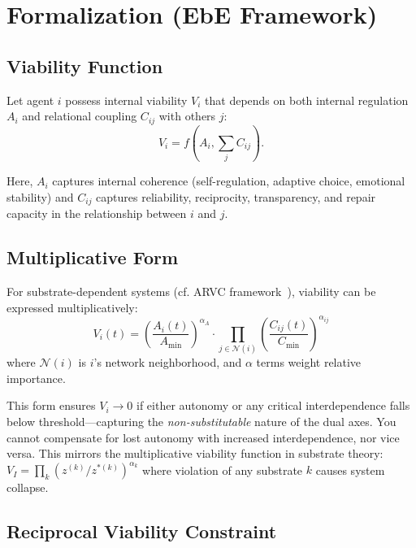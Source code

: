 \documentclass[11pt,a4paper]{article}
\begin{document}
\section{Formalization (EbE Framework)}

\subsection{Viability Function}

Let agent $i$ possess internal viability $V_i$ that depends on both internal regulation $A_i$ and relational coupling $C_{ij}$ with others $j$:
\begin{equation}
  V_i = f\!\left(A_i, \sum_{j} C_{ij}\right).
  \label{eq:viability-basic}
\end{equation}

Here, $A_i$ captures internal coherence (self-regulation, adaptive choice, emotional stability) and $C_{ij}$ captures reliability, reciprocity, transparency, and repair capacity in the relationship between $i$ and $j$.

\subsection{Multiplicative Form}

For substrate-dependent systems (cf. ARVC framework~\cite{arvc}), viability can be expressed multiplicatively:
\begin{equation}
  V_i(t) = \left(\frac{A_i(t)}{A_{\min}}\right)^{\alpha_A} \cdot \prod_{j \in \mathcal{N}(i)} \left(\frac{C_{ij}(t)}{C_{\min}}\right)^{\alpha_{ij}}
  \label{eq:viability-multiplicative}
\end{equation}
where $\mathcal{N}(i)$ is $i$'s network neighborhood, and $\alpha$ terms weight relative importance. 

This form ensures $V_i \to 0$ if either autonomy or any critical interdependence falls below threshold---capturing the \emph{non-substitutable} nature of the dual axes. You cannot compensate for lost autonomy with increased interdependence, nor vice versa. This mirrors the multiplicative viability function in substrate theory: $V_I = \prod_k (z^{(k)}/z^{*(k)})^{\alpha_k}$ where violation of any substrate $k$ causes system collapse.

\subsection{Reciprocal Viability Constraint}
\end{document}
